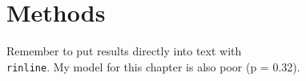 \section{Methods}

Remember to put results directly into text with \texttt{\\rinline}.
My model for this chapter is also poor (p = 0.32).

